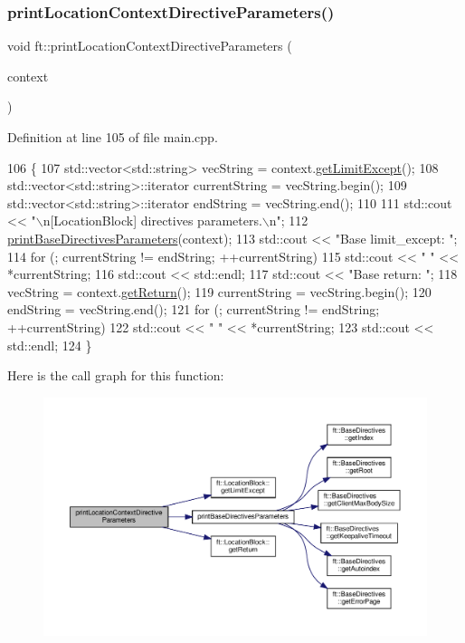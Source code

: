 \subsubsection{\texorpdfstring{print\+Location\+Context\+Directive\+Parameters()}{printLocationContextDirectiveParameters()}}
{\footnotesize\ttfamily void ft\+::print\+Location\+Context\+Directive\+Parameters (\begin{DoxyParamCaption}\item[{\hyperlink{classft_1_1_location_block}{ft\+::\+Location\+Block} \&}]{context }\end{DoxyParamCaption})}



Definition at line 105 of file main.\+cpp.


\begin{DoxyCode}
106     \{
107         std::vector<std::string>        vecString = context.\hyperlink{classft_1_1_location_block_ad2dc75d3f9c9f06f31e3948823557d52}{getLimitExcept}();
108         std::vector<std::string>::iterator  currentString = vecString.begin();
109         std::vector<std::string>::iterator      endString = vecString.end();
110 
111         std::cout << \textcolor{stringliteral}{"\(\backslash\)n[LocationBlock] directives parameters.\(\backslash\)n"};
112         \hyperlink{namespaceft_af12105e484dbac115fe1d6a4ff074f27}{printBaseDirectivesParameters}(context);
113         std::cout << \textcolor{stringliteral}{"Base limit\_except: "};
114         \textcolor{keywordflow}{for} (; currentString != endString; ++currentString)
115             std::cout << \textcolor{stringliteral}{" "} << *currentString;
116         std::cout << std::endl;
117         std::cout << \textcolor{stringliteral}{"Base return: "};
118         vecString = context.\hyperlink{classft_1_1_location_block_aeef5e4710c02406c46e54d4aa0c8f57c}{getReturn}();
119         currentString = vecString.begin();
120         endString = vecString.end();
121         \textcolor{keywordflow}{for} (; currentString != endString; ++currentString)
122             std::cout << \textcolor{stringliteral}{" "} << *currentString;
123         std::cout << std::endl;
124     \}
\end{DoxyCode}
Here is the call graph for this function\+:
\nopagebreak
\begin{figure}[H]
\begin{center}
\leavevmode
\includegraphics[width=350pt]{namespaceft_a0036b0ebdedb1a1a1956f4ac3fafdbc4_cgraph}
\end{center}
\end{figure}

